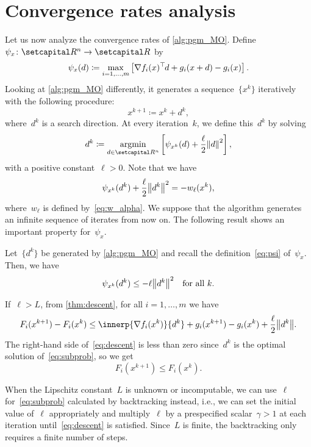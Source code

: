 \documentclass[../../main]{subfiles}
\begin{document}
\section{Convergence rates analysis} \label{sec:pgm:rate}
Let us now analyze the convergence rates of \cref{alg:pgm_MO}.
Define~$\psi_x \colon \setR^n \to \setR$ by
\begin{equation} \label{eq:psi}
    \psi_x(d) \coloneqq \max_{i = 1, \dots, m} \left[ \nabla f_i(x)^\top\hspace{-1pt} d + g_i(x + d) - g_i(x) \right].
\end{equation}
Looking at \cref{alg:pgm_MO} differently, it generates a sequence~$\{ x^k \}$ iteratively with the following procedure:
\[
    x^{k + 1} \coloneqq x^k + d^k,
\]
where~$d^k$ is a search direction.
At every iteration~$k$, we define this~$d^k$ by solving
\begin{equation} \label{eq:subprob}
    d^k \coloneqq \argmin_{d \in \setR^n} \left[ \psi_{x^k}(d) + \frac{\ell}{2} \norm*{ d }^2 \right],
\end{equation}
with a positive constant~$\ell > 0$.
Note that we have
\begin{equation} \label{eq:psi w_ell}
    \psi_{x^k}(d^k) + \frac{\ell}{2} \norm*{ d^k }^2 = - w_\ell(x^k),
\end{equation}
where~$w_\ell$ is defined by~\cref{eq:w_alpha}.
We suppose that the algorithm generates an infinite sequence of iterates from now on.
The following result shows an important property for~$\psi_x$.
\begin{lemma} \label{lem: psi property}
    Let~$\{ d^k \}$ be generated by \cref{alg:pgm_MO} and recall the definition~\cref{eq:psi} of~$\psi_x$. Then, we have
    \[
        \psi_{x^k}(d^k) \le - \ell \norm*{d^k}^2 \forallcondition{k}.
    \]
\end{lemma}
If~$\ell > L$, from \cref{thm:descent}, for all $i = 1, \dots, m$ we have
\begin{equation} \label{eq:descent}
    F_i(x^{k + 1}) - F_i(x^k) \le \innerp{\nabla f_i(x^k)}{d^k} + g_i(x^{k + 1}) - g_i(x^k) + \frac{\ell}{2}\norm*{d^k}.
\end{equation}
The right-hand side of~\cref{eq:descent} is less than zero since~$d^k$ is the optimal solution of~\cref{eq:subprob}, so we get
\begin{equation} \label{eq:nonincreasing}
    F_i(x^{k + 1}) \le F_i(x^k).
\end{equation}
\begin{remark}
    When the Lipschitz constant~$L$ is unknown or incomputable, we can use~$\ell$ for~\cref{eq:subprob} calculated by backtracking instead, i.e., we can set the initial value of~$\ell$ appropriately and multiply~$\ell$ by a prespecified scalar~$\gamma > 1$ at each iteration until~\cref{eq:descent} is satisfied.
    Since~$L$ is finite, the backtracking only requires a finite number of steps.
\end{remark}




\end{document}
